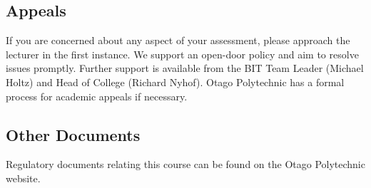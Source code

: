 \documentclass{article}
\begin{document}
\subsection*{Appeals}
If you are concerned about any aspect of your assessment, please approach the lecturer in the first instance. We support an open-door policy and aim to resolve issues promptly. Further support is available from the BIT Team Leader (Michael Holtz) and Head of College (Richard Nyhof). Otago Polytechnic has a formal process for academic appeals if necessary.

\subsection*{Other Documents}
Regulatory documents relating this course can be found on the Otago Polytechnic website.
\end{document}
